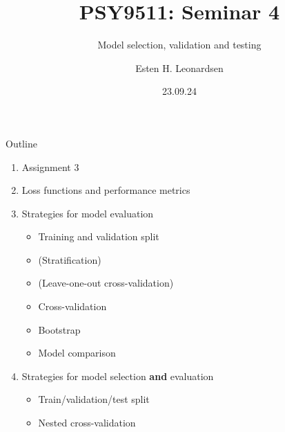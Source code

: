 \documentclass[10pt]{beamer}
\title{PSY9511: Seminar 4}
\subtitle{Model selection, validation and testing}
\author{Esten H. Leonardsen}
\date{23.09.24}
\begin{document}
	\begin{frame}
	 	\titlepage
	\end{frame}

    \begin{frame}
        \vfill
        \centering
        \vfill
    \end{frame}

    \begin{frame}{Outline}
        \begin{enumerate}
            \item Assignment 3
            \item Loss functions and performance metrics
            \item Strategies for model evaluation
            \begin{itemize}
                \item Training and validation split
                \item (Stratification)
                \item (Leave-one-out cross-validation)
                \item Cross-validation
                \item Bootstrap
                \item Model comparison
            \end{itemize}
            \item Strategies for model selection \textbf{and} evaluation
            \begin{itemize}
                \item Train/validation/test split
                \item Nested cross-validation
            \end{itemize}
        \end{enumerate}
    \end{frame}
\end{document}
